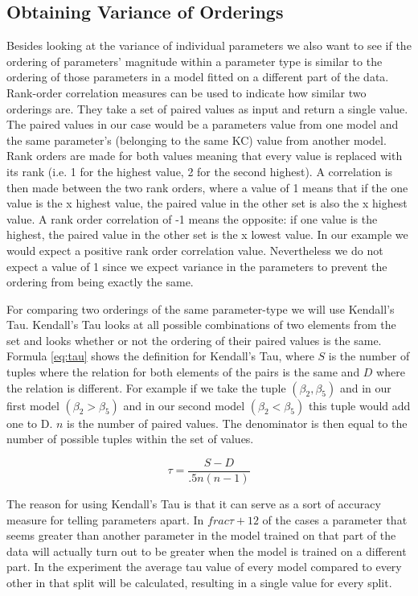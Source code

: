 \documentclass{scrartcl}
\begin{document}
\subsection{Obtaining Variance of Orderings}
Besides looking at the variance of individual parameters we also want to see if the ordering of parameters' magnitude within a parameter type is similar to the ordering of those parameters in a model fitted on a different part of the data. Rank-order correlation measures can be used to indicate how similar two orderings are. They take a set of paired values as input and return a single value. The paired values in our case would be a parameters value from one model and the same parameter's (belonging to the same KC) value from another model. Rank orders are made for both values meaning that every value is replaced with its rank (i.e. 1 for the highest value, 2 for the second highest). A correlation is then made between the two rank orders, where a value of 1 means that if the one value is the x highest value, the paired value in the other set is also the x highest value. A rank order correlation of -1 means the opposite: if one value is the  highest, the paired value in the other set is the x lowest value. In our example we would expect a positive rank order correlation value. Nevertheless we do not expect a value of 1 since we expect variance in the parameters to prevent the ordering from being exactly the same. 

For comparing two orderings of the same parameter-type we will use Kendall's Tau. Kendall's Tau looks at all possible combinations of two elements from the set and looks whether or not the ordering of their paired values is the same. Formula \ref{eq:tau} shows the definition for Kendall's Tau, where $S$ is the number of tuples where the relation for both elements of the pairs is the same and $D$ where the relation is different. For example if we take the tuple $(\beta_{2},\beta_{5})$ and in our first model $(\beta_{2}>\beta_{5})$ and in our second model $(\beta_{2}<\beta_{5})$ this tuple would add one to D. $n$ is the number of paired values. The denominator is then equal to the number of possible tuples within the set of values.
  
\begin{equation}
\label{eq:tau}
\tau=\frac{S-D}{.5 n (n-1)}
\end{equation}

The reason for using Kendall's Tau is that it can serve as a sort of accuracy measure for telling parameters apart. In $frac{\tau+1}{2}$ of the cases a parameter that seems greater than another parameter in the model trained on that part of the data will actually turn out to be greater when the model is trained on a different part. In the experiment the average tau value of every model compared to every other in that split will be calculated, resulting in a single value for every split.
\end{document}
